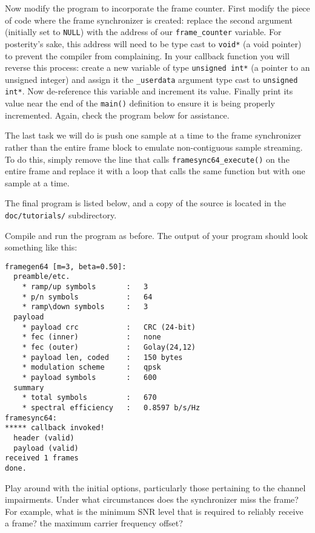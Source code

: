Now modify the program to incorporate the frame counter.
First modify the piece of code where the frame synchronizer is created:
replace the second argument (initially set to {\tt NULL}) with the address
of our {\tt frame\_counter} variable.
For posterity's sake, this address will need to be type cast to
{\tt void*} (a void pointer) to prevent the compiler from complaining.
In your callback function you will reverse this process:
create a new variable of type {\tt unsigned int*}
(a pointer to an unsigned integer)
and assign it the {\tt \_userdata} argument type cast to
{\tt unsigned int*}.
Now de-reference this variable and increment its value.
Finally print its value near the end of the {\tt main()} definition to
ensure it is being properly incremented.
Again, check the program below for assistance.

The last task we will do is push one sample at a time to the frame
synchronizer rather than the entire frame block to emulate
non-contiguous sample streaming.
To do this, simply remove the line that calls
{\tt framesync64\_execute()} on the entire frame
and replace it with a loop that calls the same function but with one
sample at a time.

The final program is listed below,
and a copy of the source is located in the {\tt doc/tutorials/}
subdirectory.
%

%
Compile and run the program as before.
The output of your program should look something like this:
%
\begin{Verbatim}[fontsize=\small]
framegen64 [m=3, beta=0.50]:
  preamble/etc.
    * ramp/up symbols       :   3
    * p/n symbols           :   64
    * ramp\down symbols     :   3
  payload
    * payload crc           :   CRC (24-bit)
    * fec (inner)           :   none
    * fec (outer)           :   Golay(24,12)
    * payload len, coded    :   150 bytes
    * modulation scheme     :   qpsk
    * payload symbols       :   600
  summary
    * total symbols         :   670
    * spectral efficiency   :   0.8597 b/s/Hz
framesync64:
***** callback invoked!
  header (valid)
  payload (valid)
received 1 frames
done.
\end{Verbatim}
%
Play around with the initial options, particularly those pertaining to
the channel impairments.
Under what circumstances does the synchronizer miss the frame?
For example, what is the minimum SNR level that is required to reliably
receive a frame?
the maximum carrier frequency offset?

